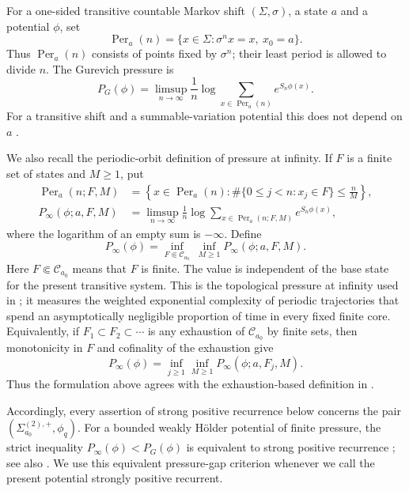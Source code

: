 \documentclass[11pt,reqno]{amsart}
\numberwithin{equation}{section}
\theoremstyle{definition}
\theoremstyle{remark}
\newcommand{\cC}{\mathcal C}
\begin{document}
For a one-sided transitive countable Markov shift $(\Sigma,\sigma)$, a state
$a$ and a potential $\phi$, set
\[
 \operatorname{Per}_a(n)
 =\{x\in\Sigma:\sigma^n x=x,\ x_0=a\}.
\]
Thus $\operatorname{Per}_a(n)$ consists of points fixed by $\sigma^n$; their
least period is allowed to divide $n$.  The Gurevich pressure is
\begin{equation}\label{eq:weighted-gurevich-pressure}
 P_G(\phi)=\limsup_{n\to\infty}\frac1n
 \log\sum_{x\in\operatorname{Per}_a(n)}e^{S_n\phi(x)}.
\end{equation}
For a transitive shift and a summable-variation potential this does not depend
on $a$ \cite{Sarig1999}.

We also recall the periodic-orbit definition of pressure at infinity.  If
$F$ is a finite set of states and $M\ge1$, put
\begin{align}
 \operatorname{Per}_a(n;F,M)
 &=\left\{x\in\operatorname{Per}_a(n):
 \#\{0\le j<n:x_j\in F\}\le\frac nM\right\},
 \label{eq:escaping-periodic-set}\\
 P_\infty(\phi;a,F,M)
 &=\limsup_{n\to\infty}\frac1n
 \log\sum_{x\in\operatorname{Per}_a(n;F,M)}e^{S_n\phi(x)},
 \label{eq:escaping-periodic-pressure}
\end{align}
where the logarithm of an empty sum is $-\infty$.  Define
\begin{equation}\label{eq:pressure-at-infinity-definition}
 P_\infty(\phi)
 =\inf_{F\Subset\cC_{a_0}}\ \inf_{M\ge1}
 P_\infty(\phi;a,F,M).
\end{equation}
Here $F\Subset\cC_{a_0}$ means that $F$ is finite.  The value is independent
of the base state for the present transitive system.  This is the topological
pressure at infinity used in \cite{RuhrSarig2022,Velozo2026}; it measures the
weighted exponential complexity of periodic trajectories that spend an
asymptotically negligible proportion of time in every fixed finite core.
Equivalently, if
$F_1\subset F_2\subset\cdots$ is any exhaustion of $\cC_{a_0}$ by finite
sets, then monotonicity in $F$ and cofinality of the exhaustion give
\[
 P_\infty(\phi)
 =\inf_{j\ge1}\inf_{M\ge1}P_\infty(\phi;a,F_j,M).
\]
Thus the formulation above agrees with the exhaustion-based definition in
\cite[Section~3.1]{Velozo2026}.

Accordingly, every assertion of strong positive recurrence below concerns
the pair $(\Sigma^{(2),+}_{a_0},\phi_q)$.  For a bounded weakly H\"older
potential of finite pressure, the strict inequality
$P_\infty(\phi)<P_G(\phi)$ is equivalent to strong positive recurrence
\cite[Theorem~8.2]{RuhrSarig2022}; see also \cite{Velozo2026}.  We use this
equivalent pressure-gap criterion whenever we call the present potential
strongly positive recurrent.
\end{document}
